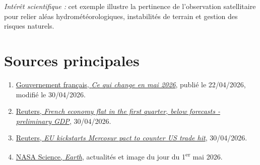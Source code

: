 \documentclass[11pt,a4paper]{article}
\begin{document}
\textit{Intérêt scientifique :} cet exemple illustre la pertinence de l'observation satellitaire pour relier aléas hydrométéorologiques, instabilités de terrain et gestion des risques naturels.

\section*{Sources principales}
\begin{enumerate}[leftmargin=1.5em,itemsep=0.2em]
    \item \href{https://www.info.gouv.fr/actualite/ce-qui-change-en-mai-2026}{Gouvernement français, \textit{Ce qui change en mai 2026}}, publié le 22/04/2026, modifié le 30/04/2026.
    \item \href{https://www.reuters.com/markets/us/french-economy-flat-first-quarter-below-forecasts-preliminary-gdp-2026-04-30/}{Reuters, \textit{French economy flat in the first quarter, below forecasts - preliminary GDP}}, 30/04/2026.
    \item \href{https://www.reuters.com/world/china/eu-kickstarts-mercosur-pact-counter-us-trade-hit-2026-04-30/}{Reuters, \textit{EU kickstarts Mercosur pact to counter US trade hit}}, 30/04/2026.
    \item \href{https://science.nasa.gov/earth/}{NASA Science, \textit{Earth}}, actualités et image du jour du 1\textsuperscript{er} mai 2026.
\end{enumerate}
\end{document}
